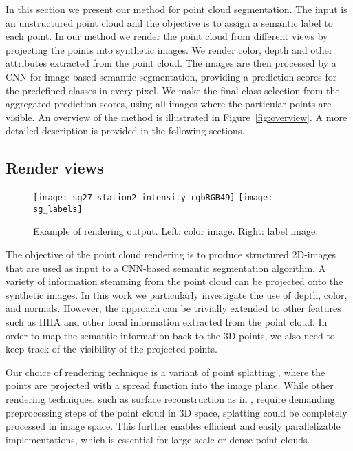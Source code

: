 \documentclass[runningheads,a4paper]{llncs}
\begin{document}
In this section we present our method for point cloud segmentation. The input is an unstructured point cloud and the objective is to assign a semantic label to each point. In our method we render the point cloud from different views by projecting the points into synthetic images. We render color, depth and other attributes extracted from the point cloud. The images are then processed by a CNN for image-based semantic segmentation, providing a prediction scores for the predefined classes in every pixel. We make the final class selection from the aggregated prediction scores, using all images where the particular points are visible. An overview of the method is illustrated in Figure~\ref{fig:overview}. A more detailed description is provided in the following sections. 


\subsection{Render views}
\label{sec:render}

\begin{figure}[!t]
    \begin{center}
        \texttt{[image: sg27\_station2\_intensity\_rgbRGB49]}
        \texttt{[image: sg\_labels]}
    \end{center}
    \caption{Example of rendering output. Left: color image. Right: label image.}
    \label{fig:render}
\end{figure}

The objective of the point cloud rendering is to produce structured 2D-images that are used as input to a CNN-based semantic segmentation algorithm. A variety of information stemming from the point cloud can be projected onto the synthetic images. In this work we particularly investigate the use of depth, color, and normals. However, the approach can be trivially extended to other features such as HHA \cite{gupta2014learning} and other local information extracted from the point cloud. In order to map the semantic information back to the 3D points, we also need to keep track of the visibility of the projected points. 

Our choice of rendering technique is a variant of point splatting \cite{szeliski10,zwicker2001surface}, where the points are projected with a spread function into the image plane. While other rendering techniques, such as surface reconstruction as in \cite{kazhdan2013screened}, require demanding preprocessing steps of the point cloud in 3D space, splatting could be completely processed in image space. This further enables efficient and easily parallelizable implementations, which is essential for large-scale or dense point clouds.
 
\end{document}
